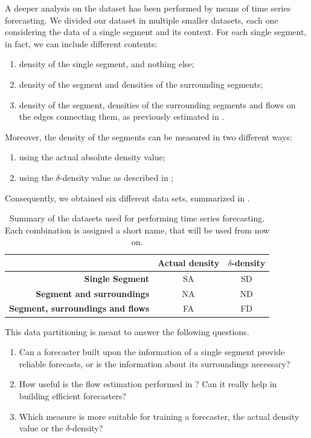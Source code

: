 \documentclass[12pt,a4paper,twoside,openright]{book}
\begin{document}
A deeper analysis on the dataset has been performed by means of time series forecasting.
%
We divided our dataset in multiple smaller datasets, each one considering the data of a single segment and its context.
%
For each single segment, in fact, we can include different contents:
\begin{enumerate}
 \item density of the single segment, and nothing else;
 \item density of the segment and densities of the surrounding segments;
 \item density of the segment, densities of the surrounding segments and flows on the edges connecting them, as previously estimated in .
\end{enumerate}
%
Moreover, the density of the segments can be measured in two different ways:
\begin{enumerate}
 \item using the actual absolute density value;
 \item using the $\delta$-density value as described in ;
\end{enumerate}
%
Consequently, we obtained six different data sets, summarized in .
\begin{table}
\begin{center}
\begin{tabular}{r | c | c }
 & \textbf{Actual density} & \textbf{$\delta$-density} \\
\hline
\hline
\textbf{Single Segment} & SA & SD \\
\hline
\textbf{Segment and surroundings} & NA & ND \\
\hline
\textbf{Segment, surroundings and flows} & FA & FD \\
\hline
\hline
\end{tabular}
\caption[Summary of the datasets]{Summary of the datasets used for performing time series forecasting. Each combination is assigned a short name, that will be used from now on.}
\label{tab:datasets}
\end{center}
\end{table}
%
This data partitioning is meant to answer the following questions.
\begin{enumerate}
 \item Can a forecaster built upon the information of a single segment provide reliable forecasts, or is the information about its surroundings necessary?
 \item How useful is the flow estimation performed in ? Can it really help in building efficient forecasters?
 \item Which measure is more suitable for training a forecaster, the actual density value or the $\delta$-density?
\end{enumerate}
\end{document}
